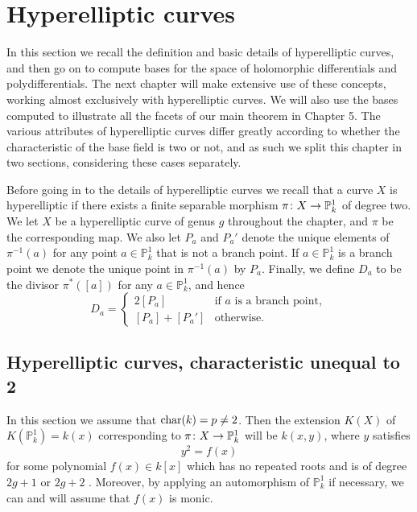 \chapter{Hyperelliptic curves} \label{chapterhyperellipticcurves}


In this section we recall the definition and basic details of hyperelliptic curves, and then go on to compute bases for the space of holomorphic differentials and polydifferentials.
The next chapter will make extensive use of these concepts, working almost exclusively with hyperelliptic curves.
We will also use the bases computed to illustrate all the facets of our main theorem in Chapter 5.
The various attributes of hyperelliptic curves differ greatly according to whether the characteristic of the base field is two or not, and as such we split this chapter in two sections, considering these cases separately.


Before going in to the details of hyperelliptic curves we recall that a curve $X$ is hyperelliptic if there exists a finite separable morphism $\pi \colon X \rightarrow {\mathbb P}_k^1$ of degree two.
We let $X$ be a hyperelliptic curve of genus $g$ throughout the chapter, and $\pi$ be the corresponding map.  
We also let $P_a$ and $P_a'$ denote the unique elements of $\pi^{-1}(a)$ for any point $a \in \mathbb P_k^1$ that is not a branch point.
If $a \in \mathbb P_k^1$ is a branch point we denote the unique point in $\pi^{-1}(a)$ by $P_a$.
Finally, we define $D_a$ to be the divisor $\pi^*\left([a]\right)$ for any $a \in \mathbb P_k^1$, and hence
    \begin{equation*}
    D_a= 
        \begin{cases}
         2[P_a] & \text{if $a$ is a branch point}, \\
         [P_a] + [P_a'] & \text{otherwise.}
        \end{cases}
    \end{equation*}

\section{Hyperelliptic curves, characteristic unequal to 2}\label{charneq2}

In this section we assume that $\operatorname{char}(k) = p \neq 2$.
Then the extension $K(X)$ of $K(\mathbb P_k^1) = k(x)$ corresponding to $ \pi \colon X \rightarrow \mathbb P_k^1$ will be $k(x,y)$, where $y$ satisfies
    \begin{equation}\label{equationdefiningequationpnot2}
    y^2 = f(x)
    \end{equation}
for some polynomial $f(x) \in k[x]$ which has no repeated roots and is of degree $2g+1$ or $2g+2$ \cite[Prop.\ 7.4.24]{liu}.
Moreover, by applying an automorphism of $\mathbb P_k^1$ if necessary, we can and will assume that $f(x)$ is monic.

